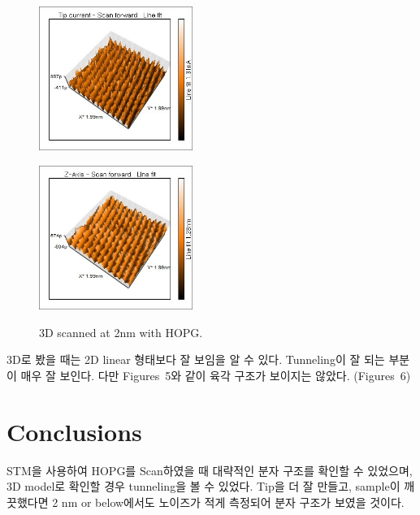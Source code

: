 \documentclass[a4paper, 10pt, nanum]{CSUniSchoolLabReport}
\begin{document}
	\begin{figure}[htb!]
		\centering
		\begin{minipage}{.5\textwidth}
			\centering
			\includegraphics[width=5cm]{Figures/Scan_2nm_3D1.jpg}
			\label{fig:Scan_2nm_3D1}
		\end{minipage}
		\begin{minipage}{.5\textwidth}
			\centering
			\includegraphics[width=5cm]{Figures/Scan_2nm_3D2.jpg}
			\label{fig:Scan_2nm_3D2}
		\end{minipage}
		\caption{3D scanned at 2nm with HOPG.}
	\end{figure}

	3D로 봤을 때는 2D linear 형태보다 잘 보임을 알 수 있다. Tunneling이 잘 되는 부분이 매우 잘 보인다. 다만 Figures~5와 같이 육각 구조가 보이지는 않았다. (Figures~6)


\section{Conclusions}

	STM을 사용하여 HOPG를 Scan하였을 때 대략적인 분자 구조를 확인할 수 있었으며, 3D model로 확인할 경우 tunneling을 볼 수 있었다. Tip을 더 잘 만들고, sample이 깨끗했다면 2 nm or below에서도 노이즈가 적게 측정되어 분자 구조가 보였을 것이다.

\end{document}
